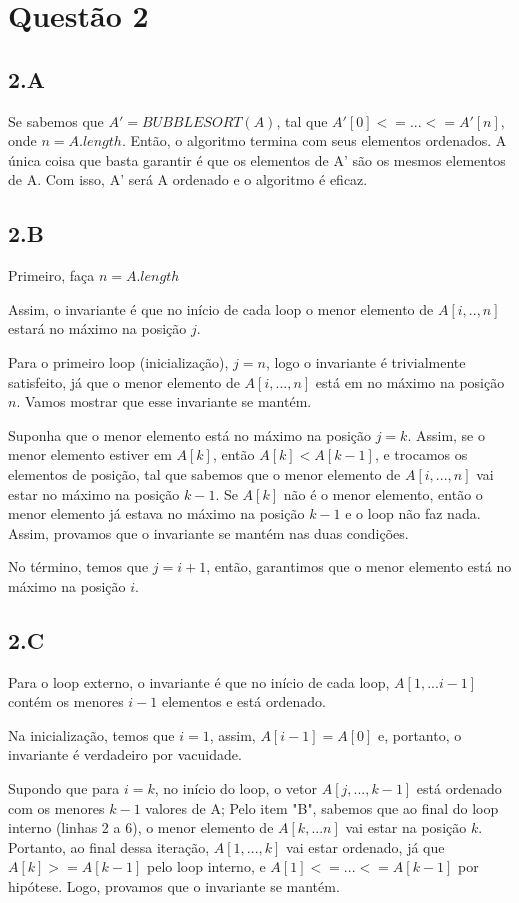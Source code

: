 \documentclass{article}
\begin{document}
\section*{Questão 2}
\subsection*{2.A}
Se sabemos que $A' = BUBBLESORT(A)$, tal que $A'[0]<=...<=A'[n]$, onde $n=A.length$. Então, o algoritmo
termina com seus elementos ordenados. A única coisa que basta garantir é que os elementos de A' são os 
mesmos elementos de A. Com isso, A' será A ordenado e o algoritmo é eficaz.
\subsection*{2.B}
Primeiro, faça $n = A.length$

Assim, o invariante é que no início de cada loop o menor elemento de $A[i,..,n]$ estará no
máximo na posição $j$.

Para o primeiro loop (inicialização), $j=n$, logo o invariante é trivialmente satisfeito, já que o menor
elemento de $A[i,...,n]$ está em no máximo na posição $n$. Vamos mostrar que esse invariante se mantém.

Suponha que o menor elemento está no máximo na posição $j=k$. Assim, se o menor elemento estiver em $A[k]$, então
$A[k]<A[k-1]$, e trocamos os elementos de posição, tal que sabemos que o menor elemento de $A[i,...,n]$ vai estar
no máximo na posição $k-1$. Se $A[k]$ não é o menor elemento, então o menor elemento já estava no máximo na posição
$k-1$ e o loop não faz nada. Assim, provamos que o invariante se mantém nas duas condições.

No término, temos que $j=i+1$, então, garantimos que o menor elemento está no máximo na posição $i$.
\subsection*{2.C}
Para o loop externo, o invariante é que no início de cada loop, $A[1,...i-1]$ contém os menores $i-1$ elementos
e está ordenado.

Na inicialização, temos que $i=1$, assim, $A[i-1]=A[0]$ e, portanto, o invariante é verdadeiro por vacuidade.

Supondo que para $i=k$, no início do loop, o vetor $A[j,...,k-1]$ está ordenado com os menores $k-1$ valores de A;
Pelo item "B", sabemos que ao final do loop interno (linhas 2 a 6), o menor elemento de $A[k,...n]$ vai estar na posição $k$.
Portanto, ao final dessa iteração, $A[1,...,k]$ vai estar ordenado, já que $A[k]>=A[k-1]$ pelo loop interno, e 
$A[1]<=...<=A[k-1]$ por hipótese. Logo, provamos que o invariante se mantém.
\end{document}
